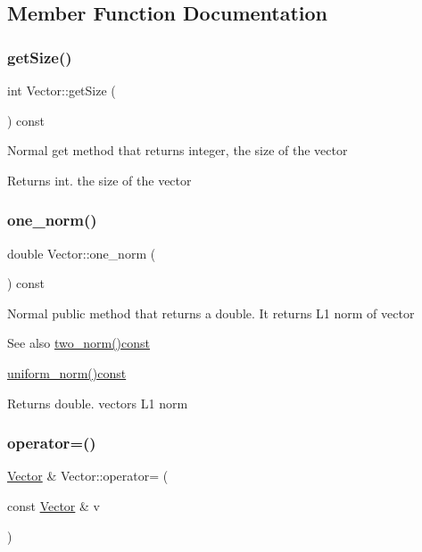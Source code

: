 \subsection{Member Function Documentation}
\mbox{\label{class_vector_afbb7966ec4107c43ec15cccc47fcaef7}} 
\subsubsection{\texorpdfstring{get\+Size()}{getSize()}}
{\footnotesize\ttfamily int Vector\+::get\+Size (\begin{DoxyParamCaption}{ }\end{DoxyParamCaption}) const}

Normal get method that returns integer, the size of the vector \begin{DoxyReturn}{Returns}
int. the size of the vector 
\end{DoxyReturn}
\mbox{\label{class_vector_a6752a90058ddef427ca6aed12946a737}} 
\subsubsection{\texorpdfstring{one\+\_\+norm()}{one\_norm()}}
{\footnotesize\ttfamily double Vector\+::one\+\_\+norm (\begin{DoxyParamCaption}{ }\end{DoxyParamCaption}) const}

Normal public method that returns a double. It returns L1 norm of vector \begin{DoxySeeAlso}{See also}
\hyperlink{class_vector_a4f501290a50d057bb6c57ea64d7e70a4}{two\+\_\+norm()const} 

\hyperlink{class_vector_a50b72131eaf3698a9876d99ab6912a32}{uniform\+\_\+norm()const} 
\end{DoxySeeAlso}
\begin{DoxyReturn}{Returns}
double. vectors L1 norm 
\end{DoxyReturn}
\mbox{\label{class_vector_ae48c467a9f65d60e2f7455aba4ca1239}} 
\subsubsection{\texorpdfstring{operator=()}{operator=()}}
{\footnotesize\ttfamily \hyperlink{class_vector}{Vector} \& Vector\+::operator= (\begin{DoxyParamCaption}\item[{const \hyperlink{class_vector}{Vector} \&}]{v }\end{DoxyParamCaption})}

